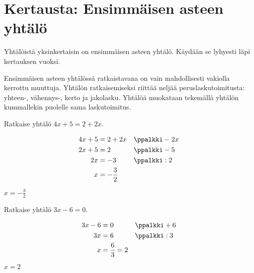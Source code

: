 \section{Kertausta: Ensimmäisen asteen yhtälö}

Yhtälöistä yksinkertaisin on ensimmäisen asteen yhtälö. Käydään se lyhyesti läpi kertauksen vuoksi.

Ensimmäisen asteen yhtälössä ratkaistavana on vain mahdollisesti vakiolla kerrottu muuttuja. Yhtälön ratkaisemiseksi riittää neljää peruslaskutoimitusta: yhteen-, vähennys-, kerto ja jakolasku. Yhtälöä muokataan tekemällä yhtälön kummallekin puolelle sama laskutoimitus.



\begin{esimerkki}
Ratkaise yhtälö $4x + 5 = 2 + 2x$.

\begin{esimratk}
\begin{align*}
    4x + 5 &= 2 + 2x && \ppalkki -2x \\
    2x + 5 &= 2      && \ppalkki -5 \\
        2x &= -3     && \ppalkki :2 \\
         x &= -\frac{3}{2}
 \end{align*}
\end{esimratk}
\begin{esimvast}
$x=-\frac{3}{2}$
\end{esimvast}
\end{esimerkki}

\begin{esimerkki}
Ratkaise yhtälö $3x - 6 = 0$.

\begin{esimratk}
  \begin{align*}
    3x - 6 &= 0 && \ppalkki +6 \\
        3x &= 6 && \ppalkki :3 \\
         x &= \frac{6}{3}  = 2 \\
  \end{align*}
\end{esimratk}
\begin{esimvast}
$x=2$
\end{esimvast}
\end{esimerkki}

